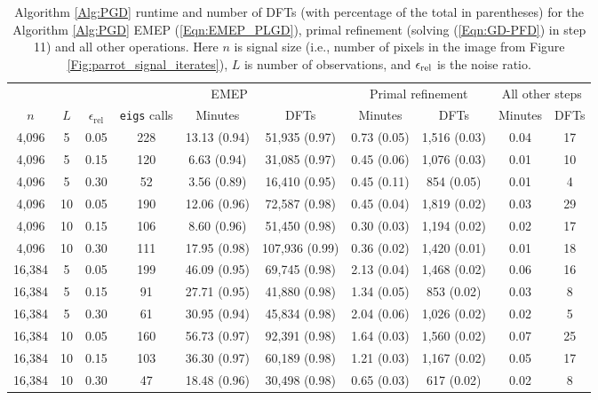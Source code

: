 \begin{enumerate}
\begin{table}[H]
\begin{footnotesize}
{\hspace{-0.7cm}
\begin{tabular}{ |ccc|ccc|cc|cc| }
 \hline
			&&&  \multicolumn{3}{c|}{EMEP} 
			&  \multicolumn{2}{c|}{Primal refinement}
			& 	\multicolumn{2}{c|}{All other steps}	\\
$n$ & $L$ & $\epsilon_\text{rel}$ 	& \texttt{eigs} calls  & Minutes & DFTs & Minutes  & DFTs & Minutes  & DFTs   \\
 \hline
 4,096 &  5 & 0.05 & 228 & 13.13  (0.94) &  51,935  (0.97) & 0.73  (0.05) &   1,516  (0.03) & 0.04 &     17 	\\
 4,096 &  5 & 0.15 & 120 & 6.63  (0.94) &  31,085  (0.97) & 0.45  (0.06) &   1,076  (0.03) & 0.01 &     10 \\
 4,096 &  5 & 0.30 &  52 & 3.56  (0.89) &  16,410  (0.95) & 0.45  (0.11) &    854  (0.05) & 0.01 &      4 \\
 4,096 & 10 & 0.05 & 190 & 12.06  (0.96) &  72,587  (0.98) & 0.45  (0.04) &   1,819  (0.02) & 0.03 &     29	\\ 
 4,096 & 10 & 0.15 & 106 & 8.60  (0.96) &  51,450  (0.98) & 0.30  (0.03) &   1,194  (0.02) & 0.02 &     17 \\
 4,096 & 10 & 0.30 & 111 & 17.95  (0.98) & 107,936  (0.99) & 0.36  (0.02) &   1,420  (0.01) & 0.01 &     18 \\
 \hline
16,384 &  5 & 0.05 & 199 & 46.09  (0.95) &  69,745  (0.98) & 2.13  (0.04) &   1,468  (0.02) & 0.06 &     16	\\
16,384 &  5 & 0.15 &  91 & 27.71  (0.95) &  41,880  (0.98) & 1.34  (0.05) &    853  (0.02) & 0.03 &      8	\\
16,384 &  5 & 0.30 &  61 & 30.95  (0.94) &  45,834  (0.98) & 2.04  (0.06) &   1,026  (0.02) & 0.02 &      5	\\
16,384 & 10 & 0.05 & 160 & 56.73  (0.97) &  92,391  (0.98) & 1.64  (0.03) &   1,560  (0.02) & 0.07 &     25	\\
16,384 & 10 & 0.15 & 103 & 36.30  (0.97) &  60,189  (0.98) & 1.21  (0.03) &   1,167  (0.02) & 0.05 &     17	\\
16,384 & 10 & 0.30 &  47 & 18.48  (0.96) &  30,498  (0.98) & 0.65  (0.03) &    617  (0.02) & 0.02 &      8	\\
 \hline
\end{tabular}

}
\end{footnotesize}
\caption{Algorithm \ref{Alg:PGD} runtime and number of DFTs (with percentage of the total in parentheses) for the Algorithm \ref{Alg:PGD} EMEP (\ref{Eqn:EMEP_PLGD}), primal refinement (solving (\ref{Eqn:GD-PFD}) in step 11) and all other operations. Here $n$ is signal size (i.e., number of pixels in the image from Figure \ref{Fig:parrot_signal_iterates}), $L$ is number of observations, and $\epsilon_\textnormal{rel}$ is the noise ratio.} \label{Tab:EMEP_costs}
\end{table}



\end{enumerate}
